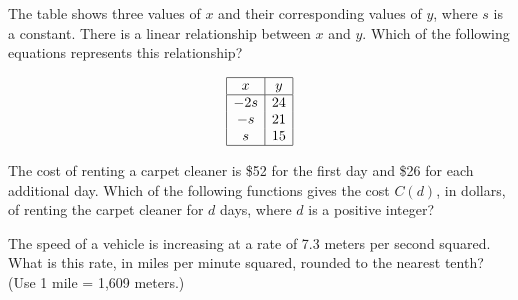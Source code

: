 \vspace{0.75em}


\vspace{2em}
\newpage

\noindent\markforreview
\vspace{1em}

The table shows three values of \(x\) and their corresponding values of \(y\), where \(s\) is a constant.
There is a linear relationship between \(x\) and \(y\).
Which of the following equations represents this relationship?

\[
\begin{array}{|c|c|}
\hline
x & y \\
\hline
-2s & 24 \\
-s & 21 \\
s & 15 \\
\hline
\end{array}
\]

\vspace{0.75em}


\vspace{2em}
\newpage

\noindent\markforreview
\vspace{1em}

The cost of renting a carpet cleaner is \$52 for the first day and \$26 for each additional day.
Which of the following functions gives the cost \(C(d)\), in dollars, of renting the carpet cleaner for \(d\) days, where \(d\) is a positive integer?

\vspace{0.75em}


\vspace{2em}
\newpage

\noindent\markforreview
\vspace{1em}

The speed of a vehicle is increasing at a rate of 7.3 meters per second squared.
What is this rate, in miles per minute squared, rounded to the nearest tenth?
(Use 1 mile = 1,609 meters.)


